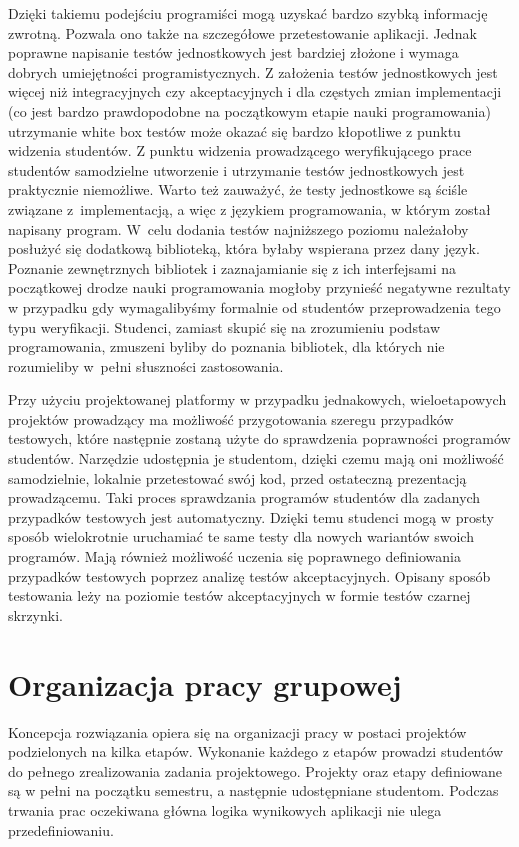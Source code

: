 Dzięki takiemu podejściu programiści mogą uzyskać bardzo szybką informację zwrotną.
Pozwala ono także na szczegółowe przetestowanie aplikacji.
Jednak poprawne napisanie testów jednostkowych jest bardziej złożone i wymaga dobrych umiejętności programistycznych.
Z założenia testów jednostkowych jest więcej niż integracyjnych czy akceptacyjnych i dla częstych zmian implementacji (co jest bardzo prawdopodobne na początkowym etapie nauki programowania) utrzymanie white box testów może okazać się bardzo kłopotliwe z punktu widzenia studentów.
Z punktu widzenia prowadzącego weryfikującego prace studentów samodzielne utworzenie i utrzymanie testów jednostkowych jest praktycznie niemożliwe.
Warto też zauważyć, że testy jednostkowe są ściśle związane z~implementacją, a więc z językiem programowania, w którym został napisany program.
W~celu dodania testów najniższego poziomu należałoby posłużyć się dodatkową biblioteką, która byłaby wspierana przez dany język.
Poznanie zewnętrznych bibliotek i zaznajamianie się z ich interfejsami na początkowej drodze nauki programowania mogłoby przynieść negatywne rezultaty w przypadku gdy wymagalibyśmy formalnie od studentów przeprowadzenia tego typu weryfikacji.
Studenci, zamiast skupić się na zrozumieniu podstaw programowania, zmuszeni byliby do poznania bibliotek, dla których nie rozumieliby w~pełni słuszności zastosowania.

Przy użyciu projektowanej platformy w przypadku jednakowych, wieloetapowych projektów prowadzący ma możliwość przygotowania szeregu przypadków testowych, które następnie zostaną użyte do sprawdzenia poprawności programów studentów.
Narzędzie udostępnia je studentom, dzięki czemu mają oni możliwość samodzielnie, lokalnie przetestować swój kod, przed ostateczną prezentacją prowadzącemu.
Taki proces sprawdzania programów studentów dla zadanych przypadków testowych jest automatyczny.
Dzięki temu studenci mogą w prosty sposób wielokrotnie uruchamiać te same testy dla nowych wariantów swoich programów.
Mają również możliwość uczenia się poprawnego definiowania przypadków testowych poprzez analizę testów akceptacyjnych.
Opisany sposób testowania leży na poziomie testów akceptacyjnych w formie testów czarnej skrzynki.

\section{Organizacja pracy grupowej}

Koncepcja rozwiązania opiera się na organizacji pracy w postaci projektów podzielonych na kilka etapów.
Wykonanie każdego z etapów prowadzi studentów do pełnego zrealizowania zadania projektowego.
Projekty oraz etapy definiowane są w pełni na początku semestru, a następnie udostępniane studentom.
Podczas trwania prac oczekiwana główna logika wynikowych aplikacji nie ulega przedefiniowaniu.

